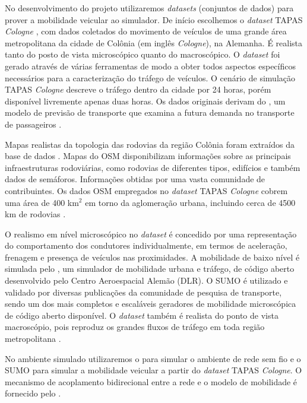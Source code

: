 \documentclass[mestrado, pre-defesa, english, brazil]{packages/icmc}
\begin{document}
No desenvolvimento do projeto utilizaremos \textit{datasets} (conjuntos de dados) para prover a mobilidade veicular ao simulador. De início escolhemos o \textit{dataset} TAPAS \textit{Cologne} \cite{tapas-2014}, com dados coletados do movimento de veículos de uma grande área metropolitana da cidade de Colônia (em inglês \textit{Cologne}), na Alemanha. É realista tanto do posto de vista microscópico quanto do macroscópico. O \textit{dataset} foi gerado através de várias ferramentas de modo a obter todos aspectos específicos necessários para a caracterização do tráfego de veículos. O cenário de simulação TAPAS \textit{Cologne} descreve o tráfego dentro da cidade por 24 horas, porém disponível livremente apenas duas horas. Os dados originais derivam do , um modelo de previsão de transporte que examina a futura demanda no transporte de passageiros \cite{uppoor-2012,tapas-2014}.

Mapas realistas da topologia das rodovias da região Colônia foram extraídos da base de dados . Mapas do OSM disponibilizam informações sobre as principais infraestruturas rodoviárias, como rodovias de diferentes tipos, edifícios e também dados de semáforos. Informações obtidas por uma vasta comunidade de contribuintes. Os dados OSM empregados no \textit{dataset} TAPAS \textit{Cologne} cobrem uma área de 400 km$^{2}$ em torno da aglomeração urbana, incluindo cerca de 4500 km de rodovias \cite{tapas-2014,uppoor-2012}.

O realismo em nível microscópico no \textit{dataset} é concedido por uma representação do comportamento dos condutores individualmente, em termos de aceleração, frenagem e presença de veículos nas proximidades. A mobilidade de baixo nível é simulada pelo  \cite{SUMO-2012}, um simulador de mobilidade urbana e tráfego, de código aberto desenvolvido pelo Centro Aeroespacial Alemão (DLR). O SUMO é utilizado e validado por diversas publicações da comunidade de pesquisa de transporte, sendo um dos mais completos e escaláveis geradores de mobilidade microscópica de código aberto disponível. O \textit{dataset} também é realista do ponto de vista macroscópio, pois reproduz os grandes fluxos de tráfego em toda região metropolitana \cite{uppoor-2012,tapas-2014}.

No ambiente simulado utilizaremos o  \cite{OMNeT++-2014} para simular o ambiente de rede sem fio e o SUMO para simular a mobilidade veicular a partir do \textit{dataset} TAPAS \textit{Cologne}. O mecanismo de acoplamento bidirecional entre a rede e o modelo de mobilidade é fornecido pelo  \cite{Veins-2014}.
\end{document}
